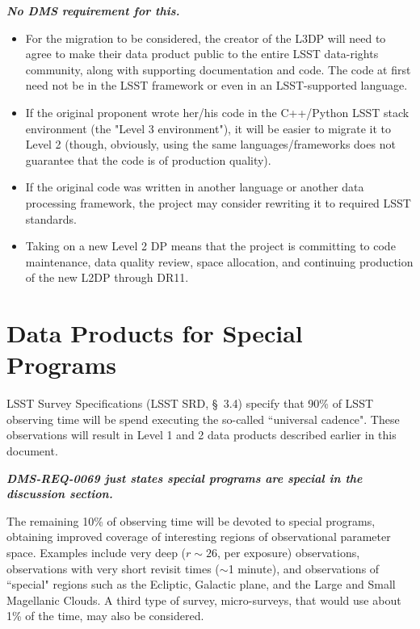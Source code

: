 \documentclass[12pt]{article}
\newcommand{\annotate}[1]{{\color{magenta}\large\textbf{\emph{#1}}}}
\newcommand{\req}[1]{\marginpar{\tiny #1}}
\begin{document}
\annotate{No DMS requirement for this.}

\begin{itemize}
\item For the migration to be considered, the creator of the L3DP will need to agree to make their data product public to the entire LSST data-rights community, along with supporting documentation and code. The code at first need not be in the LSST framework or even in an LSST-supported language.
\item If the original proponent wrote her/his code in the C++/Python LSST stack environment (the "Level 3 environment"), it will be easier to migrate it to Level 2 (though, obviously, using the same languages/frameworks does not guarantee that the code is of production quality).
\item If the original code was written in another language or another data processing framework, the project may consider rewriting it to required LSST standards.
\item Taking on a new Level 2 DP means that the project is committing to code maintenance, data quality review, space allocation, and continuing production of the new L2DP through DR11.
\end{itemize}

\clearpage

\section{Data Products for Special Programs}
\label{sec:specialProgs}

\req{LSR-REQ-0075}
LSST Survey Specifications (LSST SRD, \S~3.4) specify that 90\% of LSST observing time will be spend executing the so-called ``universal cadence". These observations will result in Level 1 and 2 data products described earlier in this document.

\annotate{DMS-REQ-0069 just states special programs are special in the discussion section.}

The remaining 10\% of observing time will be devoted to special programs, obtaining improved coverage of interesting regions of observational parameter space. Examples include very deep ($r \sim 26$, per exposure) observations, observations with very short revisit times ($\sim$1 minute), and observations of ``special" regions such as the Ecliptic, Galactic plane, and the Large and Small Magellanic Clouds. A third type of survey, micro-surveys, that would use about 1\% of the time, may also be considered.
\end{document}
